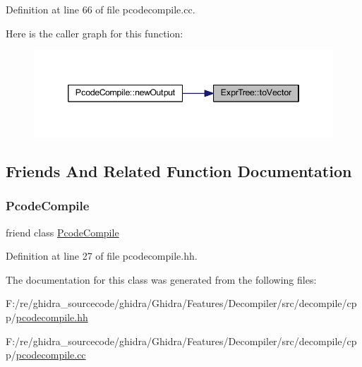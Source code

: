 Definition at line 66 of file pcodecompile.\+cc.

Here is the caller graph for this function\+:
\nopagebreak
\begin{figure}[H]
\begin{center}
\leavevmode
\includegraphics[width=346pt]{class_expr_tree_ac02d77a8e8d695f150db35768b534181_icgraph}
\end{center}
\end{figure}


\subsection{Friends And Related Function Documentation}
\mbox{\label{class_expr_tree_a574e38848f5b66a6b527d9763d4e7a1f}} 
\subsubsection{\texorpdfstring{PcodeCompile}{PcodeCompile}}
{\footnotesize\ttfamily friend class \mbox{\hyperlink{class_pcode_compile}{Pcode\+Compile}}\hspace{0.3cm}{\ttfamily [friend]}}



Definition at line 27 of file pcodecompile.\+hh.



The documentation for this class was generated from the following files\+:\begin{DoxyCompactItemize}
\item 
F\+:/re/ghidra\+\_\+sourcecode/ghidra/\+Ghidra/\+Features/\+Decompiler/src/decompile/cpp/\mbox{\hyperlink{pcodecompile_8hh}{pcodecompile.\+hh}}\item 
F\+:/re/ghidra\+\_\+sourcecode/ghidra/\+Ghidra/\+Features/\+Decompiler/src/decompile/cpp/\mbox{\hyperlink{pcodecompile_8cc}{pcodecompile.\+cc}}\end{DoxyCompactItemize}
